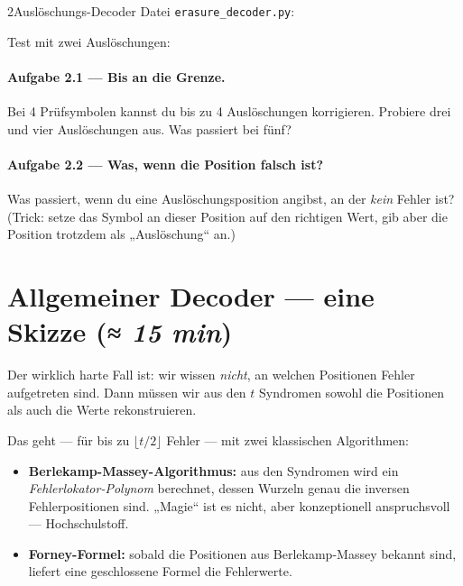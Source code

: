 \begin{pythoneinheit}{2}{Auslöschungs-Decoder}
Datei \texttt{erasure\_decoder.py}:


Test mit zwei Auslöschungen:


\paragraph{Aufgabe 2.1 — Bis an die Grenze.}
Bei 4 Prüfsymbolen kannst du bis zu 4 Auslöschungen korrigieren.
Probiere drei und vier Auslöschungen aus. Was passiert bei fünf?

\paragraph{Aufgabe 2.2 — Was, wenn die Position falsch ist?}
Was passiert, wenn du eine Auslöschungsposition angibst, an der
\emph{kein} Fehler ist? (Trick: setze das Symbol an dieser Position
auf den richtigen Wert, gib aber die Position trotzdem als
„Auslöschung“ an.)
\end{pythoneinheit}

\section{Allgemeiner Decoder — eine Skizze \normalfont(\textit{≈ 15 min})}

Der wirklich harte Fall ist: wir wissen \emph{nicht}, an welchen
Positionen Fehler aufgetreten sind. Dann müssen wir aus den $t$
Syndromen sowohl die Positionen als auch die Werte rekonstruieren.

Das geht — für bis zu $\lfloor t/2 \rfloor$ Fehler — mit zwei
klassischen Algorithmen:

\begin{itemize}
\item \textbf{Berlekamp-Massey-Algorithmus:} aus den Syndromen wird
  ein \emph{Fehlerlokator-Polynom} berechnet, dessen Wurzeln genau
  die inversen Fehlerpositionen sind. „Magie“ ist es nicht, aber
  konzeptionell anspruchsvoll — Hochschulstoff.
\item \textbf{Forney-Formel:} sobald die Positionen aus
  Berlekamp-Massey bekannt sind, liefert eine geschlossene Formel
  die Fehlerwerte.
\end{itemize}

